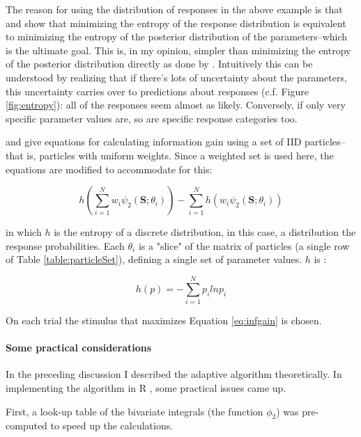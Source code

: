 \documentclass{article}\usepackage{knitr}
\begin{document}
The reason for using the distribution of responses in the above example is that \citet{kujalalukka2006} and \citet{kujala2011} show that minimizing the entropy of the response distribution is equivalent to minimizing the entropy of the posterior distribution of the parameters--which is the ultimate goal. This is, in my opinion, simpler than minimizing the entropy of the posterior distribution directly as done by \citet{kontsevichtyler1999}. Intuitively this can be understood by realizing that if there's lots of uncertainty about the parameters, this uncertainty carries over to predictions about responses (c.f. Figure \ref{fig:entropy}): all of the responses seem almost as likely. Conversely, if only very specific parameter values are, so are specific response categories too. 

\citet{kujalalukka2006} and \citet{kujala2011} give equations for calculating information gain using a set of IID particles--that is, particles with uniform weights. Since a weighted set is used here, the equations are modified to accommodate for this:

\begin{equation}
h(\sum_{i=1}^N w_i \psi_2(\bm{S};\theta_i)) - \sum_{i=1}^N h(w_i \psi_2(\bm{S};\theta_i)) 
\label{eq:infgain}
\end{equation}

in which $h$ is the entropy of a discrete distribution, in this case, a distribution the response probabilities. Each $\theta_i$ is a "slice" of the matrix of particles (a single  row of Table \ref{table:particleSet}), defining a single set of parameter values. $h$ is \citep{kontsevichtyler1999}:

\begin{equation}
h(p) = -\sum_{i = 1}^{N} p_i ln p_i
\end{equation}

On each trial the stimulus that maximizes Equation \ref{eq:infgain} is chosen.  

\paragraph{Some practical considerations}
\label{sec:practical_considerations}

In the preceding discussion I described the adaptive algorithm theoretically. In implementing the algorithm in R \citep{r_language}, some practical issues came up. 

First, a look-up table of the bivariate integrals (the function $\phi_2$) was pre-computed to speed up the calculations. 
\end{document}
